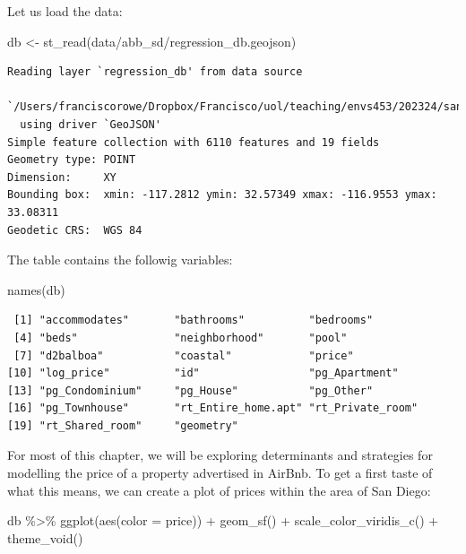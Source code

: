 \documentclass[
  letterpaper,
  DIV=11,
  numbers=noendperiod,
  oneside]{scrreprt}
\newenvironment{Shaded}{\begin{snugshade}}{\end{snugshade}}
\newcommand{\AttributeTok}[1]{\textcolor[rgb]{0.40,0.45,0.13}{#1}}
\newcommand{\FunctionTok}[1]{\textcolor[rgb]{0.28,0.35,0.67}{#1}}
\newcommand{\NormalTok}[1]{\textcolor[rgb]{0.00,0.23,0.31}{#1}}
\newcommand{\OtherTok}[1]{\textcolor[rgb]{0.00,0.23,0.31}{#1}}
\newcommand{\SpecialCharTok}[1]{\textcolor[rgb]{0.37,0.37,0.37}{#1}}
\newcommand{\StringTok}[1]{\textcolor[rgb]{0.13,0.47,0.30}{#1}}
\begin{document}
Let us load the data:

\begin{Shaded}
\begin{Highlighting}[]
\NormalTok{db }\OtherTok{\textless{}{-}} \FunctionTok{st\_read}\NormalTok{(}\StringTok{\textquotesingle{}data/abb\_sd/regression\_db.geojson\textquotesingle{}}\NormalTok{)}
\end{Highlighting}
\end{Shaded}

\begin{verbatim}
Reading layer `regression_db' from data source 
  `/Users/franciscorowe/Dropbox/Francisco/uol/teaching/envs453/202324/san/data/abb_sd/regression_db.geojson' 
  using driver `GeoJSON'
Simple feature collection with 6110 features and 19 fields
Geometry type: POINT
Dimension:     XY
Bounding box:  xmin: -117.2812 ymin: 32.57349 xmax: -116.9553 ymax: 33.08311
Geodetic CRS:  WGS 84
\end{verbatim}

The table contains the followig variables:

\begin{Shaded}
\begin{Highlighting}[]
\FunctionTok{names}\NormalTok{(db)}
\end{Highlighting}
\end{Shaded}

\begin{verbatim}
 [1] "accommodates"       "bathrooms"          "bedrooms"          
 [4] "beds"               "neighborhood"       "pool"              
 [7] "d2balboa"           "coastal"            "price"             
[10] "log_price"          "id"                 "pg_Apartment"      
[13] "pg_Condominium"     "pg_House"           "pg_Other"          
[16] "pg_Townhouse"       "rt_Entire_home.apt" "rt_Private_room"   
[19] "rt_Shared_room"     "geometry"          
\end{verbatim}

For most of this chapter, we will be exploring determinants and
strategies for modelling the price of a property advertised in AirBnb.
To get a first taste of what this means, we can create a plot of prices
within the area of San Diego:

\begin{Shaded}
\begin{Highlighting}[]
\NormalTok{db }\SpecialCharTok{\%\textgreater{}\%}
  \FunctionTok{ggplot}\NormalTok{(}\FunctionTok{aes}\NormalTok{(}\AttributeTok{color =}\NormalTok{ price)) }\SpecialCharTok{+}
  \FunctionTok{geom\_sf}\NormalTok{() }\SpecialCharTok{+} 
  \FunctionTok{scale\_color\_viridis\_c}\NormalTok{() }\SpecialCharTok{+}
  \FunctionTok{theme\_void}\NormalTok{()}
\end{Highlighting}
\end{Shaded}
\end{document}
